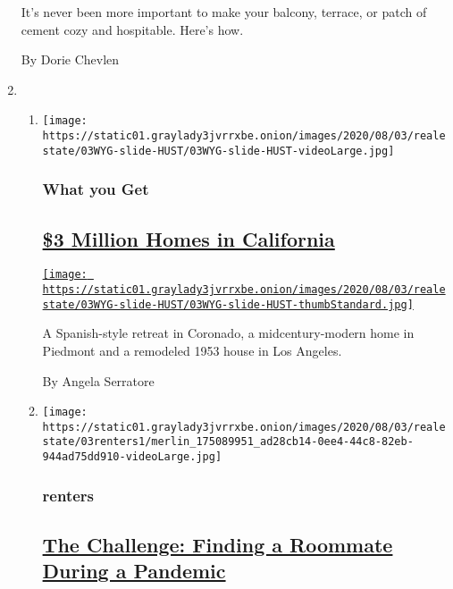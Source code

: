 \begin{enumerate}
  It's never been more important to make your balcony, terrace, or patch
  of cement cozy and hospitable. Here's how.

  By Dorie Chevlen
\item
  \begin{enumerate}
  \def\labelenumii{\arabic{enumii}.}
  \item
    \texttt{[image: https://static01.graylady3jvrrxbe.onion/images/2020/08/03/realestate/03WYG-slide-HUST/03WYG-slide-HUST-videoLarge.jpg]}

    \hypertarget{what-you-get}{%
    \subsubsection{What you Get}\label{what-you-get}}

    \hypertarget{3-million-homes-in-california}{%
    \subsection{\texorpdfstring{\href{/2020/08/03/realestate/3-million-dollar-homes-for-sale-ca.html}{\$3
    Million Homes in
    California}}{\$3 Million Homes in California}}\label{3-million-homes-in-california}}

    \href{/2020/08/03/realestate/3-million-dollar-homes-for-sale-ca.html}{\texttt{[image: https://static01.graylady3jvrrxbe.onion/images/2020/08/03/realestate/03WYG-slide-HUST/03WYG-slide-HUST-thumbStandard.jpg]}}

    A Spanish-style retreat in Coronado, a midcentury-modern home in
    Piedmont and a remodeled 1953 house in Los Angeles.

    By Angela Serratore
  \item
    \texttt{[image: https://static01.graylady3jvrrxbe.onion/images/2020/08/03/realestate/03renters1/merlin\_175089951\_ad28cb14-0ee4-44c8-82eb-944ad75dd910-videoLarge.jpg]}

    \hypertarget{renters}{%
    \subsubsection{renters}\label{renters}}

    \hypertarget{the-challenge-finding-a-roommate-during-a-pandemic}{%
    \subsection{\texorpdfstring{\href{/2020/08/03/realestate/coronavirus-roommate-renters.html}{The
    Challenge: Finding a Roommate During a
    Pandemic}}{The Challenge: Finding a Roommate During a Pandemic}}\label{the-challenge-finding-a-roommate-during-a-pandemic}}


\end{enumerate}
\end{enumerate}
